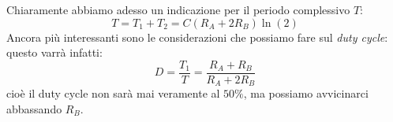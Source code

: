 \documentclass[a4paper,11pt]{article}
\begin{document}
Chiaramente abbiamo adesso un indicazione per il periodo complessivo $T$:
$$
T = T_1 + T_2 = C (R_A + 2 R_B) \ln (2)
$$
Ancora più interessanti sono le considerazioni che possiamo fare sul \textit{duty cycle}: questo varrà infatti:
$$
D = \frac{T_1}{T} = \frac{R_A + R_B}{R_A + 2 R_B}
$$
cioè il duty cycle non sarà mai veramente al $50 \%$, ma possiamo avvicinarci abbassando $R_B$.
\end{document}
